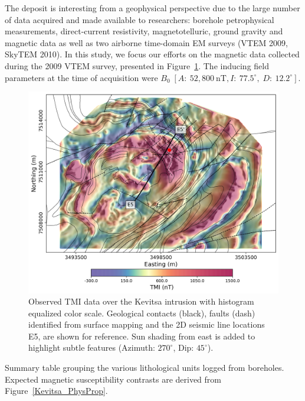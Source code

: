 \documentclass[paper]{geophysics}
\begin{document}
The deposit is interesting from a geophysical perspective due to the large number of data acquired and made available to researchers: borehole petrophysical measurements, direct-current resistivity, magnetotelluric, ground gravity and magnetic data as well as two airborne time-domain EM surveys (VTEM 2009, SkyTEM 2010).
In this study, we focus our efforts on the magnetic data collected during the 2009 VTEM survey, presented in Figure~\ref{Kevitsa_TMI}. The inducing field parameters at the time of acquisition were $B_0\;[A:\:52,800\: \text{nT}, I:\:77.5^\circ, \;D:\:12.2^\circ]$.

\begin{figure}[p!]
\includegraphics[width=\columnwidth]{Figures/Figure10.png}
\caption{Observed TMI data over the Kevitsa intrusion with histogram equalized color scale. Geological contacts (black), faults (dash) identified from surface mapping and the 2D seismic line locations E5, are shown for reference. Sun shading from east is added to highlight subtle features (Azimuth: $270^\circ$, Dip: $45^\circ$).}
\label{Kevitsa_TMI}
\end{figure}

\begin{table}
\caption{Summary table grouping the various lithological units logged from boreholes. Expected magnetic susceptibility contrasts are derived from Figure~\ref{Kevitsa_PhysProp}.}
\label{Table2}
\end{table}
\end{document}
